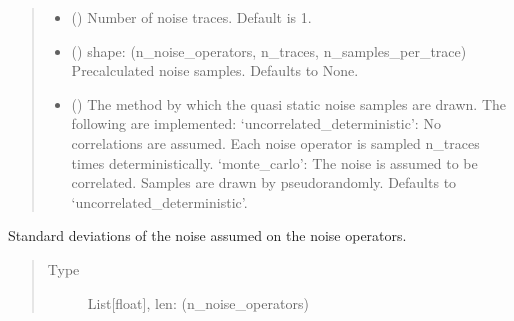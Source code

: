 \documentclass[letterpaper,10pt,english]{sphinxmanual}
\begin{document}
\begin{fulllineitems}
\begin{quote}
\begin{description}
\begin{itemize}
\item {} 
 (\sphinxstyleliteralemphasis{\sphinxupquote{, }}) \textendash{} Number of noise traces. Default is 1.

\item {} 
 (\sphinxstyleliteralemphasis{\sphinxupquote{, }}) \textendash{} shape: (n\_noise\_operators, n\_traces, n\_samples\_per\_trace)
Precalculated noise samples. Defaults to None.

\item {} 
 (\sphinxstyleliteralemphasis{\sphinxupquote{, }}\sphinxstyleliteralemphasis{\sphinxupquote{, }}) \textendash{} The method by which the quasi static noise samples are drawn. The
following are implemented:
‘uncorrelated\_deterministic’: No correlations are assumed. Each noise
operator is sampled n\_traces times deterministically.
‘monte\_carlo’: The noise is assumed to be correlated. Samples are drawn
by pseudo\sphinxhyphen{}randomly. Defaults to ‘uncorrelated\_deterministic’.

\end{itemize}

\end{description}\end{quote}

\begin{fulllineitems}
\label{\detokenize{qsim:qsim.noise.NTGQuasiStatic.standard_deviation}}
Standard deviations of the noise assumed on the noise operators.
\begin{quote}\begin{description}
\item[{Type}] \leavevmode
List{[}float{]}, len: (n\_noise\_operators)


\end{description}
\end{quote}
\end{fulllineitems}
\end{fulllineitems}
\end{document}
